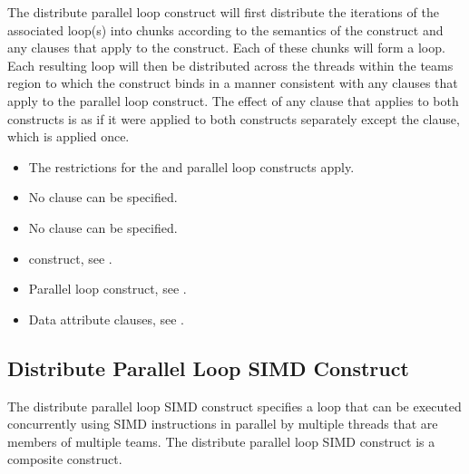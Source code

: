 {{{{\descr
The distribute parallel loop construct will first distribute the iterations of the associated loop(s) into chunks according to the semantics of the  construct and any clauses that apply to the  construct. Each of these chunks will form a loop. Each resulting loop will then be distributed across the threads within the teams region to which the  construct binds in a manner consistent with any clauses that apply to the parallel loop construct. 
The effect of any clause that applies to both constructs is as if it were applied to both constructs separately except the  clause, which is applied once.

\vspace{-6pt}

\restrictions
\begin{itemize}
\item The restrictions for the  and parallel loop constructs apply.
\item No  clause can be specified.
\item No  clause can be specified.
\end{itemize}

\vspace{-6pt}

\crossreferences
\begin{itemize}
\item {} construct, see 
.

\item Parallel loop construct, see 
.

\item Data attribute clauses, see 
.
\end{itemize}






\vspace{-24pt}

\subsection{Distribute Parallel Loop SIMD Construct}
\label{subsec:Distribute Parallel Loop SIMD Construct}
\summary
The distribute parallel loop SIMD construct specifies a loop that can be executed 
concurrently using SIMD instructions in parallel by multiple threads that are members 
of multiple teams. The distribute parallel loop SIMD construct is a composite construct.

}}}}
